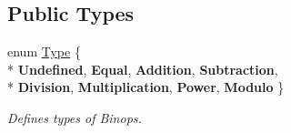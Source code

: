 \subsection*{Public Types}
\begin{DoxyCompactItemize}
\item 
\hypertarget{classBinop_a833e85c431d85ca69758bfebec9193dc}{}enum \hyperlink{classBinop_a833e85c431d85ca69758bfebec9193dc}{Type} \{ \\*
{\bfseries Undefined}, 
{\bfseries Equal}, 
{\bfseries Addition}, 
{\bfseries Subtraction}, 
\\*
{\bfseries Division}, 
{\bfseries Multiplication}, 
{\bfseries Power}, 
{\bfseries Modulo}
 \}\label{classBinop_a833e85c431d85ca69758bfebec9193dc}

\begin{DoxyCompactList}\small\item\em Defines types of Binops. \end{DoxyCompactList}\end{DoxyCompactItemize}
